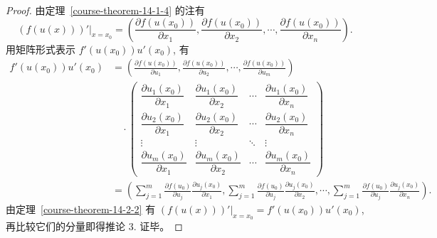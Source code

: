 \documentclass[12pt,fontset=fandol]{ctexart}
\begin{document}
\begin{proof}\quad 由定理~\ref{course-theorem-14-1-4}  的注有
\[
  \left.(f(u(x)))'\right|_{x=x_0}
  =\left(
  \frac{\partial f(u(x_0))}{\partial x_1},
  \frac{\partial f(u(x_0))}{\partial x_2},
  \cdots,
  \frac{\partial f(u(x_0))}{\partial x_n}
  \right).
\]
用矩阵形式表示 $f'(u(x_0))u'(x_0)$, 有
\[
\begin{aligned}
  f'(u(x_0))u'(x_0)
  &=
  \left(
  \frac{\partial f(u(x_0))}{\partial u_1},
  \frac{\partial f(u(x_0))}{\partial u_2},
  \cdots,
  \frac{\partial f(u(x_0))}{\partial u_m}
  \right)\\
  &\quad\cdot
  \begin{pmatrix}
    \dfrac{\partial u_1(x_0)}{\partial x_1}&\dfrac{\partial u_1(x_0)}{\partial x_2}&\cdots&\dfrac{\partial u_1(x_0)}{\partial x_n}\\
    \dfrac{\partial u_2(x_0)}{\partial x_1}&\dfrac{\partial u_2(x_0)}{\partial x_2}&\cdots&\dfrac{\partial u_2(x_0)}{\partial x_n}\\
    \vdots&\vdots&\ddots&\vdots\\
    \dfrac{\partial u_m(x_0)}{\partial x_1}&\dfrac{\partial u_m(x_0)}{\partial x_2}&\cdots&\dfrac{\partial u_m(x_0)}{\partial x_n}
  \end{pmatrix}\\
  &=
  \left(
  \sum_{j=1}^m\frac{\partial f(u_0)}{\partial u_j}\frac{\partial u_j(x_0)}{\partial x_1},
  \sum_{j=1}^m\frac{\partial f(u_0)}{\partial u_j}\frac{\partial u_j(x_0)}{\partial x_2},
  \cdots,
  \sum_{j=1}^m\frac{\partial f(u_0)}{\partial u_j}\frac{\partial u_j(x_0)}{\partial x_n}
  \right).
\end{aligned}
\]
由定理~\ref{course-theorem-14-2-2}  有 $\left.(f(u(x)))'\right|_{x=x_0}=f'(u(x_0))u'(x_0)$, 再比较它们的分量即得推论 3. 证毕。

\end{proof}
\end{document}
